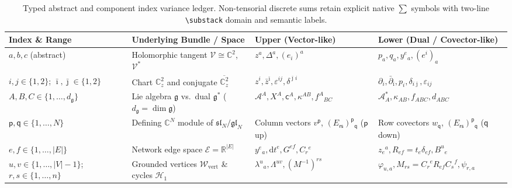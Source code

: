 \documentclass[11pt,letterpaper]{article}
\numberwithin{equation}{section}
\theoremstyle{plain}
\theoremstyle{definition}
\theoremstyle{remark}
\newcommand{\dd}{\mathrm{d}}
\newcommand{\dbar}{\bar{\partial}}
\newcommand{\fg}{\mathfrak{g}}
\newcommand{\fsl}{\mathfrak{sl}}
\newcommand{\fgl}{\mathfrak{gl}}
\begin{document}
\begin{table}[H]
\centering
\scriptsize
\setlength{\tabcolsep}{4.0pt}
\renewcommand{\arraystretch}{1.22}
\begin{tabularx}{\textwidth}{@{}ll>{\raggedright\arraybackslash}X>{\raggedright\arraybackslash}X@{}}
\toprule
\textbf{Index \& Range} & \textbf{Underlying Bundle / Space} & \textbf{Upper (Vector-like)} & \textbf{Lower (Dual / Covector-like)} \\
\midrule
$a,b,c$ (abstract) & Holomorphic tangent $\mathcal{V}\cong\mathbb{C}^2$, $\mathcal{V}^*$ & $z^a, \Delta^a, (e_i)^a$ & $p_a, q_a, y^e{}_a, (e^i)_a$ \\
$i,j \in \{1,2\}$; $\bar{\imath},\bar{\jmath} \in \{1,2\}$ & Chart $\mathbb{C}^2_z$ and conjugate $\overline{\mathbb{C}^2_z}$ & $z^i, \bar{z}^{\bar{\imath}}, \varepsilon^{ij}, \delta^{\bar{\jmath}i}$ & $\partial_i, \dbar_{\bar{\imath}}, p_i, \delta_{i\bar{\jmath}}, \varepsilon_{ij}$ \\
$A,B,C \in \{1,\dots,d_{\fg}\}$ & Lie algebra $\fg$ vs.\ dual $\fg^*$ ($d_{\fg}=\dim\fg$) & $\mathcal{A}^A, X^A, \mathsf{c}^A, \kappa^{AB}, f^A{}_{BC}$ & $\mathcal{A}^*_A, \kappa_{AB}, f_{ABC}, d_{ABC}$ \\
$\mathsf{p},\mathsf{q} \in \{1,\dots,N\}$ & Defining $\mathbb{C}^N$ module of $\fsl_N / \fgl_N$ & Column vectors $v^{\mathsf{p}}$, $(E_{\mathsf{r}\mathsf{s}})^{\mathsf{p}}{}_{\mathsf{q}}$ ($\mathsf{p}$ up) & Row covectors $w_{\mathsf{q}}$, $(E_{\mathsf{r}\mathsf{s}})^{\mathsf{p}}{}_{\mathsf{q}}$ ($\mathsf{q}$ down) \\
$e,f \in \{1,\dots,|E|\}$ & Network edge space $\mathcal{E} = \mathbb{R}^{|E|}$ & $y^e{}_a, \dd t^e, G^{ef}, C_r{}^e$ & $z_e{}^a, R_{ef} = t_e\delta_{ef}, B^u{}_e$ \\
$u,v \in \{1,\dots,|V|-1\}$; $r,s \in \{1,\dots,n\}$ & Grounded vertices $\mathcal{W}_{\mathrm{vert}}$ \& cycles $\mathcal{H}_1$ & $\lambda^u{}_a, \Lambda^{uv}, (M^{-1})^{rs}$ & $\varphi_{u,a}, M_{rs} = C_r{}^e R_{ef}C_s{}^f, \psi_{r,a}$ \\
\bottomrule
\end{tabularx}
\caption{Typed abstract and component index variance ledger. Non-tensorial discrete sums retain explicit native $\sum$ symbols with two-line \texttt{\textbackslash substack} domain and semantic labels.}
\label{tab:index-ledger}
\end{table}
\end{document}
